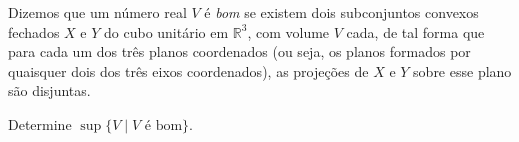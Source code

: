 Dizemos que um número real \(V\) é \emph{bom} se existem dois subconjuntos convexos fechados \(X\) e \(Y\) do cubo unitário em \(\mathbb{R}^3\), com volume \(V\) cada, de tal forma que para cada um dos três planos coordenados (ou seja, os planos formados por quaisquer dois dos três eixos coordenados), as projeções de \(X\) e \(Y\) sobre esse plano são disjuntas.

Determine \(\sup\{V \mid V \text{ é bom}\}\).
